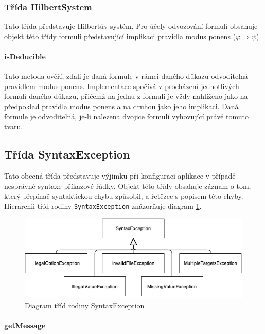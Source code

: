 \documentclass[thesis=B,czech,hidelinks]{thesis}[2012/06/26]
\begin{document}
\subsubsection{Třída HilbertSystem}

Tato třída představuje Hilbertův systém. Pro účely odvozování formulí obsahuje objekt této třídy formuli představující implikaci pravidla modus ponens ($\varphi \Rightarrow \psi$).

\paragraph{isDeducible}

Tato metoda ověří, zdali je daná formule v rámci daného důkazu odvoditelná pravidlem modus ponens. Implementace spočívá v procházení jednotlivých formulí daného důkazu, přičemž na jednu z formulí je vždy nahlíženo jako na předpoklad pravidla modus ponens a na druhou jako jeho implikaci. Daná formule je odvoditelná, je-li nalezena dvojice formulí vyhovující právě tomuto tvaru.

\subsection{Třída SyntaxException}

Tato obecná třída představuje výjimku při konfiguraci aplikace v případě nesprávné syntaxe příkazové řádky. Objekt této třídy obsahuje záznam o tom, který přepínač syntaktickou chybu způsobil, a řetězec s popisem této chyby. Hierarchii tříd rodiny \texttt{SyntaxException} znázorňuje diagram \ref{fig:syntax_exception}.

\begin{figure}
\centering
\caption{Diagram tříd rodiny SyntaxException}
\label{fig:syntax_exception}
\includegraphics[width=\linewidth]{diagrams/syntax_exception}
\end{figure}

\paragraph{getMessage}
\end{document}

